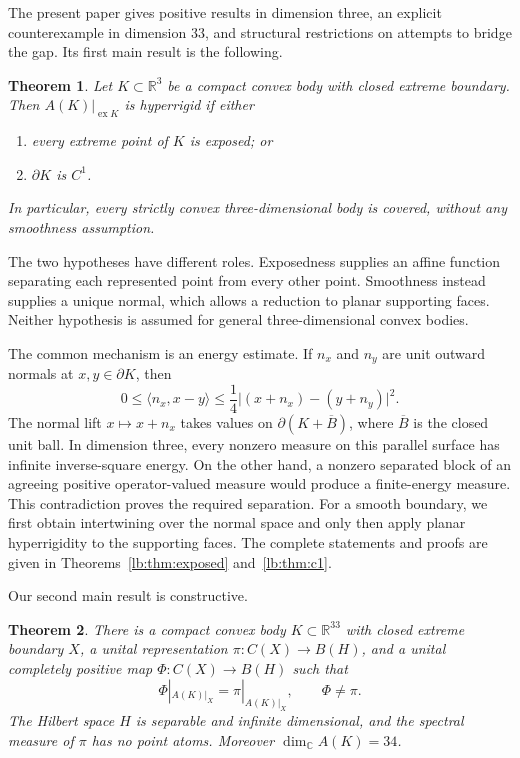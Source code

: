 \documentclass[11pt,letterpaper]{amsart}
\newtheorem{maintheorem}{Theorem}
\theoremstyle{definition}
\theoremstyle{remark}
\numberwithin{equation}{section}
\DeclareMathOperator{\ex}{ex}
\newcommand{\R}{\mathbb R}
\newcommand{\C}{\mathbb C}
\begin{document}
The present paper gives positive results in dimension three, an explicit
counterexample in dimension $33$, and structural restrictions on
attempts to bridge the gap. Its first main result is the following.

\begin{maintheorem}\label{intro:positive}
Let $K\subset\R^3$ be a compact convex body with closed extreme
boundary. Then $A(K)|_{\ex K}$ is hyperrigid if either
\begin{enumerate}
\item every extreme point of $K$ is exposed; or
\item $\partial K$ is $C^1$.
\end{enumerate}
In particular, every strictly convex three-dimensional body is covered,
without any smoothness assumption.
\end{maintheorem}

The two hypotheses have different roles. Exposedness supplies an affine
function separating each represented point from every other point.
Smoothness instead supplies a unique normal, which allows a reduction
to planar supporting faces. Neither hypothesis is assumed for general
three-dimensional convex bodies.

The common mechanism is an energy estimate. If $n_x$ and $n_y$ are unit
outward normals at $x,y\in\partial K$, then
\begin{equation}\label{intro:eq:lift}
 0\le\langle n_x,x-y\rangle
 \le\frac14\bigl|(x+n_x)-(y+n_y)\bigr|^2.
\end{equation}
The normal lift $x\mapsto x+n_x$ takes values on
$\partial(K+\overline B)$, where $\overline B$ is the closed unit ball.
In dimension three, every nonzero measure on this parallel surface has
infinite inverse-square energy. On the other hand, a nonzero separated
block of an agreeing positive operator-valued measure would produce a
finite-energy measure. This contradiction proves the required
separation. For a smooth boundary, we first obtain intertwining over
the normal space and only then apply planar hyperrigidity to the
supporting faces. The complete statements and proofs are given in
Theorems~\ref{lb:thm:exposed} and~\ref{lb:thm:c1}.

Our second main result is constructive.

\begin{maintheorem}\label{intro:example}
There is a compact convex body $K\subset\R^{33}$ with closed extreme
boundary $X$, a unital representation $\pi:C(X)\to B(H)$, and a unital
completely positive map $\Phi:C(X)\to B(H)$ such that
\[
                   \Phi|_{A(K)|_X}=\pi|_{A(K)|_X},
                   \qquad \Phi\ne\pi.
\]
The Hilbert space $H$ is separable and infinite dimensional, and the
spectral measure of $\pi$ has no point atoms. Moreover
$\dim_{\C}A(K)=34$.
\end{maintheorem}
\end{document}
